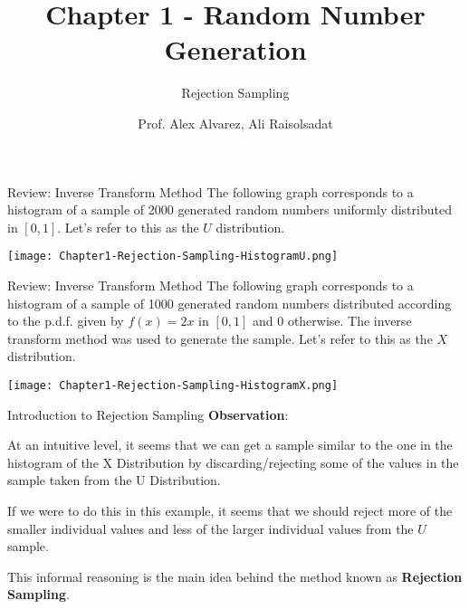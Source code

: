 \documentclass[8pt]{beamer}
\title{Chapter 1 - Random Number Generation}
\subtitle{Rejection Sampling}
\author{Prof. Alex Alvarez, Ali Raisolsadat}
\institute{School of Mathematical and Computational Sciences \\ University of Prince Edward Island}
\date{} %
\begin{document}
\maketitle

\begin{frame}{Review: Inverse Transform Method}
The following graph corresponds to a histogram of a sample of 2000 generated random numbers uniformly distributed in $[0,1]$.
Let's refer to this as the $U$ distribution.

\begin{center}
\texttt{[image: Chapter1-Rejection-Sampling-HistogramU.png]}
\end{center}

\end{frame}


\begin{frame}{Review: Inverse Transform Method}
The following graph corresponds to a histogram of a sample of 1000 generated random numbers distributed according to the p.d.f. given by $f(x)=2x$ in $[0,1]$ and 0 otherwise. The inverse transform method was used to generate the sample. Let's refer to this as the $X$ distribution.

\begin{center}
\texttt{[image: Chapter1-Rejection-Sampling-HistogramX.png]}
\end{center}
\end{frame}

\begin{frame}{Introduction to Rejection Sampling}
\textbf{Observation}:

\vspace{2mm}

At an intuitive level, it seems that we can get a sample similar to the one in the histogram of the X Distribution by discarding/rejecting some of the values in the sample taken from the U Distribution.  

\vspace{2mm}

If we were to do this in this example, it seems that we should reject more of the smaller individual values and less of the larger individual values from the $U$ sample.

\vspace{2mm}

This informal reasoning is the main idea behind the method known as \textbf{Rejection Sampling}. 
\end{frame}
\end{document}
